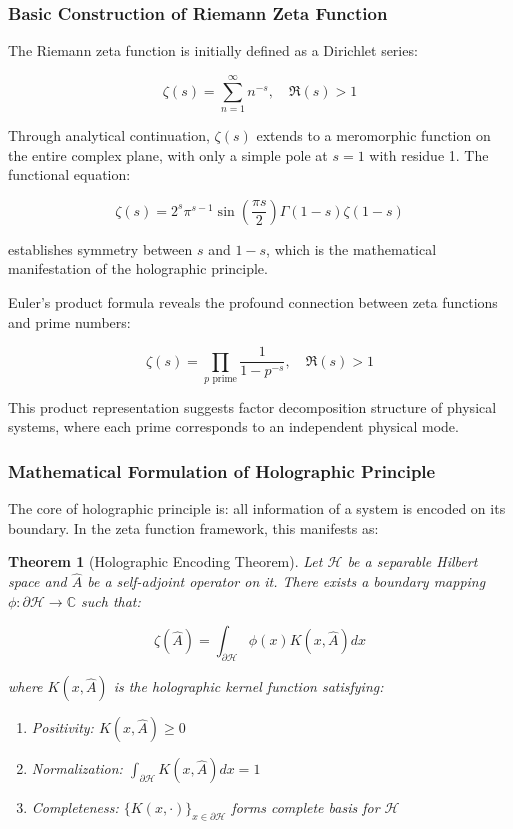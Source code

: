 \documentclass[12pt,a4paper]{article}
\newtheorem{theorem}{Theorem}[section]
\begin{document}
\subsubsection{Basic Construction of Riemann Zeta Function}

The Riemann zeta function is initially defined as a Dirichlet series:

$$\zeta(s) = \sum_{n=1}^{\infty} n^{-s}, \quad \Re(s) > 1$$

Through analytical continuation, $\zeta(s)$ extends to a meromorphic function on the entire complex plane, with only a simple pole at $s=1$ with residue 1. The functional equation:

$$\zeta(s) = 2^s \pi^{s-1} \sin\left(\frac{\pi s}{2}\right) \Gamma(1-s) \zeta(1-s)$$

establishes symmetry between $s$ and $1-s$, which is the mathematical manifestation of the holographic principle.

Euler's product formula reveals the profound connection between zeta functions and prime numbers:

$$\zeta(s) = \prod_{p \text{ prime}} \frac{1}{1-p^{-s}}, \quad \Re(s) > 1$$

This product representation suggests factor decomposition structure of physical systems, where each prime corresponds to an independent physical mode.

\subsubsection{Mathematical Formulation of Holographic Principle}

The core of holographic principle is: all information of a system is encoded on its boundary. In the zeta function framework, this manifests as:

\begin{theorem}[Holographic Encoding Theorem]
Let $\mathcal{H}$ be a separable Hilbert space and $\hat{A}$ be a self-adjoint operator on it. There exists a boundary mapping $\phi: \partial\mathcal{H} \to \mathbb{C}$ such that:

$$\zeta(\hat{A}) = \int_{\partial\mathcal{H}} \phi(x) K(x, \hat{A}) dx$$

where $K(x, \hat{A})$ is the holographic kernel function satisfying:
\begin{enumerate}
\item Positivity: $K(x, \hat{A}) \geq 0$
\item Normalization: $\int_{\partial\mathcal{H}} K(x, \hat{A}) dx = 1$
\item Completeness: $\{K(x, \cdot)\}_{x \in \partial\mathcal{H}}$ forms complete basis for $\mathcal{H}$
\end{enumerate}
\end{theorem}
\end{document}
